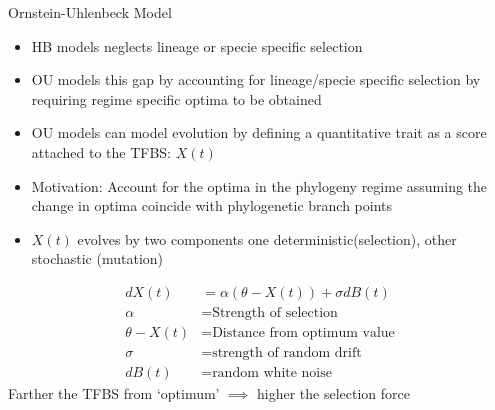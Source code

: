 \documentclass[10pt]{beamer}
\begin{document}
\begin{frame}[allowframebreaks]{Ornstein-Uhlenbeck Model}
\begin{itemize}
\item HB models neglects lineage or specie specific selection
\item OU models this gap by accounting for lineage/specie specific selection by requiring regime specific optima to be obtained
\item OU models can model evolution by defining a quantitative trait as a score attached to the TFBS: $X(t)$
\item Motivation: Account for the optima in the phylogeny regime assuming the change in optima coincide with phylogenetic branch points
\item $X(t)$ evolves by two components one deterministic(selection), other stochastic (mutation)
\end{itemize}
\begin{align*}
dX(t) &= \alpha(\theta-X(t)) + \sigma dB(t)\\
\alpha & = \text{Strength of selection}\\
\theta - X(t) & = \text{Distance from optimum value}\\
\sigma &= \text{strength of random drift}\\
dB(t) &= \text{random white noise}
\end{align*}
Farther the TFBS from `optimum' $\implies$ higher the selection force\\
\end{frame}
\end{document}
